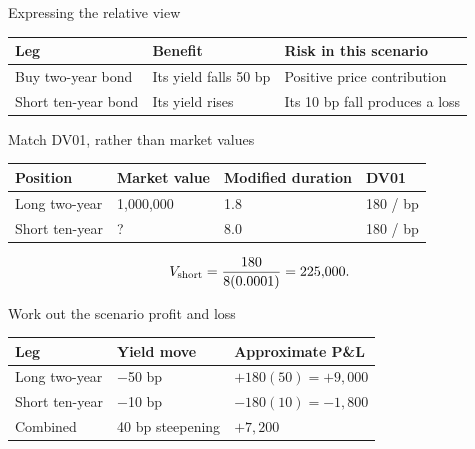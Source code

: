 \documentclass[12pt,aspectratio=169]{beamer}
\begin{document}
\begin{frame}{Expressing the relative view}
\begin{center}\begin{tabular}{@{}>{\raggedright\arraybackslash}p{}>{\raggedright\arraybackslash}p{}>{\raggedright\arraybackslash}p{}@{}}\toprule \textbf{Leg} & \textbf{Benefit} & \textbf{Risk in this scenario}\\\midrule Buy two-year bond & Its yield falls 50 bp & Positive price contribution\\[2mm]
Short ten-year bond & Its yield rises & Its 10 bp fall produces a loss\\\bottomrule\end{tabular}\end{center}
\end{frame}


\begin{frame}{Match DV01, rather than market values}
\begin{center}\begin{tabular}{@{}llll@{}}\toprule \textbf{Position} & \textbf{Market value} & \textbf{Modified duration} & \textbf{DV01}\\\midrule Long two-year & 1,000,000 & 1.8 & 180 / bp\\[2mm]
Short ten-year & ? & 8.0 & 180 / bp\\\bottomrule\end{tabular}\end{center}\[V_{\rm short}=\frac{180}{8(0.0001)}=225{,}000.\]
\end{frame}


\begin{frame}{Work out the scenario profit and loss}
\begin{center}\begin{tabular}{@{}lll@{}}\toprule \textbf{Leg} & \textbf{Yield move} & \textbf{Approximate P\&L}\\\midrule Long two-year & $-$50 bp & $+180(50)=+9{,}000$\\[2mm]
Short ten-year & $-$10 bp & $-180(10)=-1{,}800$\\[2mm]
Combined & 40 bp steepening & $+7{,}200$\\\bottomrule\end{tabular}\end{center}
\end{frame}
\end{document}
